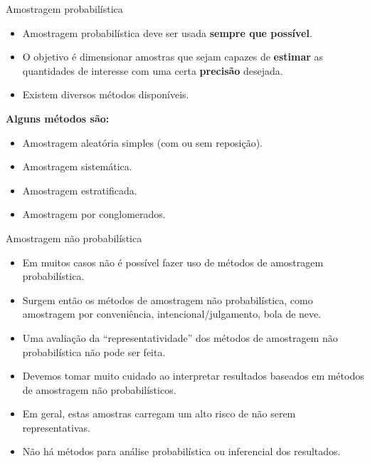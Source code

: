\documentclass[
  ignorenonframetext,
  serif,
  professionalfont,
  usenames,
  dvipsnames,
  aspectratio = 169]{beamer}
\providecommand{\tightlist}{%
  \setlength{\itemsep}{0pt}\setlength{\parskip}{0pt}}
\renewcommand{\tightlist}{%
  \setlength{\itemsep}{0\baselineskip}
  \setlength{\parskip}{0.25\baselineskip}
}
\def\beginAHalfColumn{\begin{minipage}{0.49\textwidth}}%
\def\endColumns{\end{minipage}}%
\begin{document}
\begin{frame}{Amostragem probabilística}
\label{amostragem-probabiluxedstica}
\beginAHalfColumn

\begin{itemize}
\tightlist
\item
  Amostragem probabilística deve ser usada \textbf{sempre que possível}.
\end{itemize}

\vspace{0.3cm}

\begin{itemize}
\tightlist
\item
  O objetivo é dimensionar amostras que sejam capazes de
  \textbf{estimar} as quantidades de interesse com uma certa
  \textbf{precisão} desejada.
\end{itemize}

\vspace{0.3cm}

\begin{itemize}
\tightlist
\item
  Existem diversos métodos disponíveis.
\end{itemize}

\endColumns
\beginAHalfColumn

\textbf{Alguns métodos são:}

\begin{itemize}
\tightlist
\item
  Amostragem aleatória simples (com ou sem reposição).
\item
  Amostragem sistemática.
\item
  Amostragem estratificada.
\item
  Amostragem por conglomerados.
\end{itemize}

\endColumns
\end{frame}

\begin{frame}{Amostragem não probabilística}
\label{amostragem-nuxe3o-probabiluxedstica}
\begin{itemize}
\item
  Em muitos casos não é possível fazer uso de métodos de amostragem
  probabilística.
\item
  Surgem então os métodos de amostragem não probabilística, como
  amostragem por conveniência, intencional/julgamento, bola de neve.
\item
  Uma avaliação da ``representatividade'' dos métodos de amostragem não
  probabilística não pode ser feita.
\item
  Devemos tomar muito cuidado ao interpretar resultados baseados em
  métodos de amostragem não probabilísticos.
\item
  Em geral, estas amostras carregam um alto risco de não serem
  representativas.
\item
  Não há métodos para análise probabilística ou inferencial dos
  resultados.
\end{itemize}
\end{frame}
\end{document}
